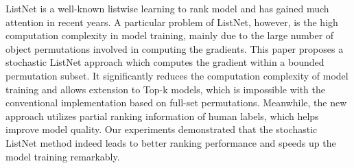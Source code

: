 ListNet is a well-known listwise learning to rank model and has gained much attention in recent years. A particular problem of ListNet, however, is the high computation complexity in model training, mainly due to the large number of object permutations involved in computing the gradients. This paper proposes a stochastic ListNet approach which computes the gradient within a bounded permutation subset. It significantly reduces the computation complexity of model training and allows extension to Top-k models, which is impossible with the conventional implementation based on full-set permutations. Meanwhile, the new approach utilizes partial ranking information of human labels, which helps improve model quality. Our experiments demonstrated that the stochastic ListNet method indeed leads to better ranking performance and speeds up the model training remarkably.
